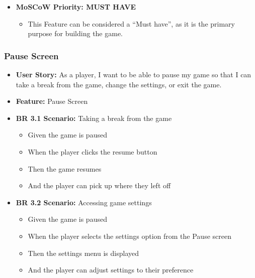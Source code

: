 \documentclass[11pt, a4paper]{article}
\begin{document}
\begin{itemize}
    \item \textbf{MoSCoW Priority: MUST HAVE}

          \begin{itemize}
              \item This Feature can be considered a “Must have”, as it is the
                    primary purpose for building the game.
          \end{itemize}
\end{itemize}

\newpage

\subsubsection{Pause Screen}

\begin{itemize}
    \item \textbf{User Story:} As a player, I want to be able to pause my game so that I can take a break from the game, change the settings, or exit the game.

    \item \textbf{Feature:} Pause Screen

    \item \textbf{BR 3.1 Scenario:} Taking a break from the game

          \begin{itemize}
              \item Given the game is paused
              \item When the player clicks the resume button
              \item Then the game resumes
              \item And the player can pick up where they left off
          \end{itemize}

    \item \textbf{BR 3.2 Scenario:} Accessing game settings

          \begin{itemize}
              \item Given the game is paused
              \item When the player selects the settings option from the Pause screen
              \item Then the settings menu is displayed
              \item And the player can adjust settings to their preference
          \end{itemize}


\end{itemize}
\end{document}
